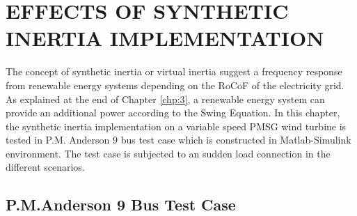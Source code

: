 \chapter{EFFECTS OF SYNTHETIC INERTIA IMPLEMENTATION}
\label{chp:5}
The concept of synthetic inertia or virtual inertia suggest a frequency response from renewable energy systems depending on the RoCoF of the electricity grid. As explained at the end of Chapter \ref{chp:3}, a renewable energy system can provide an additional power according to the Swing Equation. In this chapter, the synthetic inertia implementation on a variable speed PMSG wind turbine is tested in P.M. Anderson 9 bus test case which is constructed in Matlab-Simulink environment. The test case is subjected to an sudden load connection in the different scenarios.
\section{P.M.Anderson 9 Bus Test Case}
